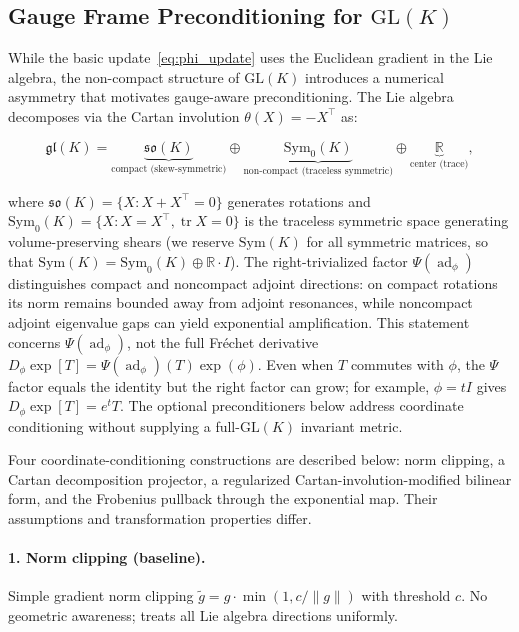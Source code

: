 \documentclass[twoside,11pt]{article}
\begin{document}
\subsection{Gauge Frame Preconditioning for $\mathrm{GL}(K)$}
\label{sec:glk_preconditioning}

While the basic update~\eqref{eq:phi_update} uses the Euclidean gradient in the Lie algebra, the non-compact structure of $\mathrm{GL}(K)$ introduces a numerical asymmetry that motivates gauge-aware preconditioning. The Lie algebra decomposes via the Cartan involution $\theta(X) = -X^\top$ as:

\begin{equation}
\mathfrak{gl}(K) = \underbrace{\mathfrak{so}(K)}_{\text{compact (skew-symmetric)}} \oplus \underbrace{\mathrm{Sym}_0(K)}_{\text{non-compact (traceless symmetric)}} \oplus \underbrace{\mathbb{R}}_{\text{center (trace)}},
\label{eq:cartan_decomposition}
\end{equation}

where $\mathfrak{so}(K) = \{X : X + X^\top = 0\}$ generates rotations and $\mathrm{Sym}_0(K) = \{X : X = X^\top, \operatorname{tr} X = 0\}$ is the traceless symmetric space generating volume-preserving shears (we reserve $\mathrm{Sym}(K)$ for all symmetric matrices, so that $\mathrm{Sym}(K) = \mathrm{Sym}_0(K) \oplus \mathbb{R}\cdot I$). The right-trivialized factor $\Psi(\operatorname{ad}_\phi)$ distinguishes compact and noncompact adjoint directions: on compact rotations its norm remains bounded away from adjoint resonances, while noncompact adjoint eigenvalue gaps can yield exponential amplification. This statement concerns $\Psi(\operatorname{ad}_\phi)$, not the full Fr\'echet derivative $D_\phi\exp[T]=\Psi(\operatorname{ad}_\phi)(T)\exp(\phi)$. Even when $T$ commutes with $\phi$, the $\Psi$ factor equals the identity but the right factor can grow; for example, $\phi=tI$ gives $D_\phi\exp[T]=e^tT$. The optional preconditioners below address coordinate conditioning without supplying a full-$\mathrm{GL}(K)$ invariant metric.

Four coordinate-conditioning constructions are described below: norm clipping, a Cartan decomposition projector, a regularized Cartan-involution-modified bilinear form, and the Frobenius pullback through the exponential map. Their assumptions and transformation properties differ.

\paragraph{1. Norm clipping (baseline).}
Simple gradient norm clipping $\tilde{g} = g \cdot \min(1, c/\|g\|)$ with threshold $c$. No geometric awareness; treats all Lie algebra directions uniformly.
\end{document}
